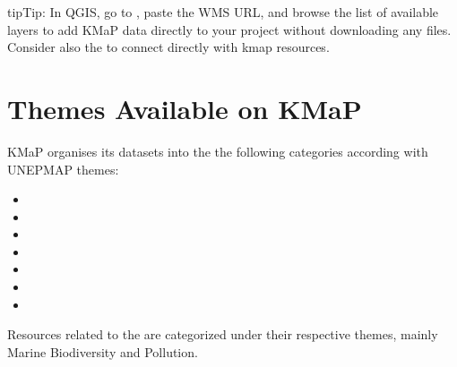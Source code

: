 \documentclass[letterpaper,10pt,english]{sphinxmanual}
\begin{document}
\begin{sphinxadmonition}{tip}{Tip:}
\sphinxAtStartPar
In QGIS, go to , paste the WMS URL,
and browse the list of available layers to add KMaP data directly to your project
without downloading any files.
Consider also the 
to connect directly with kmap resources.
\end{sphinxadmonition}


\section{Themes Available on KMaP}
\label{\detokenize{01_welcome:themes-available-on-kmap}}
\sphinxAtStartPar
KMaP organises its datasets into the the following categories according with UNEP\sphinxhyphen{}MAP themes:
\begin{itemize}
\item {} 
\sphinxAtStartPar
{} 

\item {} 
\sphinxAtStartPar
{} 

\item {} 
\sphinxAtStartPar
{} 

\item {} 
\sphinxAtStartPar
{} 

\item {} 
\sphinxAtStartPar
{} 

\item {} 
\sphinxAtStartPar
{} 

\item {} 
\sphinxAtStartPar
{} 

\end{itemize}

\sphinxAtStartPar
Resources related to the 
are categorized under their respective themes, mainly Marine Biodiversity  and Pollution.
\end{document}
